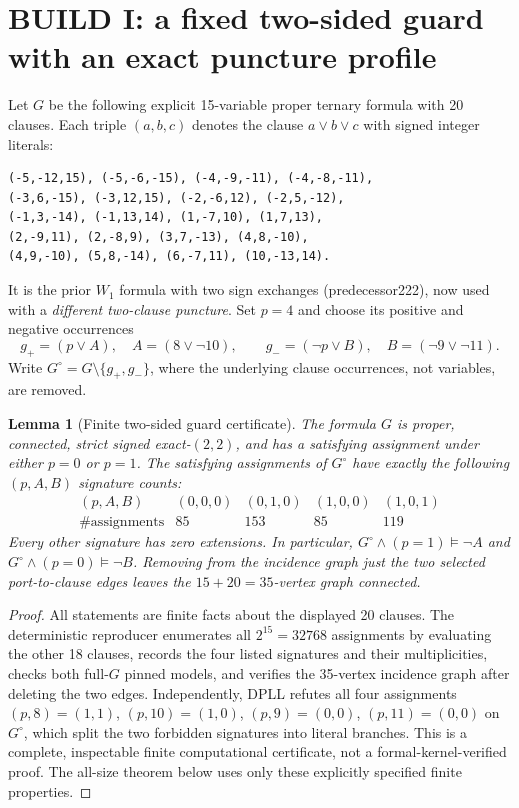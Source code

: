 \documentclass[11pt]{article}
\newtheorem{lemma}[theorem]{Lemma}
\begin{document}
\section{BUILD I: a fixed two-sided guard with an exact puncture profile}
Let $G$ be the following explicit 15-variable proper ternary formula with 20 clauses. Each triple $(a,b,c)$ denotes the clause $a\lor b\lor c$ with signed integer literals:
\begin{verbatim}
(-5,-12,15), (-5,-6,-15), (-4,-9,-11), (-4,-8,-11),
(-3,6,-15), (-3,12,15), (-2,-6,12), (-2,5,-12),
(-1,3,-14), (-1,13,14), (1,-7,10), (1,7,13),
(2,-9,11), (2,-8,9), (3,7,-13), (4,8,-10),
(4,9,-10), (5,8,-14), (6,-7,11), (10,-13,14).
\end{verbatim}
It is the prior $W_1$ formula with two sign exchanges (predecessor222), now used with a \emph{different two-clause puncture}. Set $p=4$ and choose its positive and negative occurrences
\[
 g_+=(p\vee A),\quad A=(8\vee\neg10),\qquad
 g_-=(\neg p\vee B),\quad B=(\neg9\vee\neg11).
\]
Write $G^\circ=G\setminus\{g_+,g_-\}$, where the underlying clause occurrences, not variables, are removed.
\begin{lemma}[Finite two-sided guard certificate]\label{lem:guard}
The formula $G$ is proper, connected, strict signed exact-$(2,2)$, and has a satisfying assignment under either $p=0$ or $p=1$. The satisfying assignments of $G^\circ$ have exactly the following $(p,A,B)$ signature counts:
\[
\begin{array}{c|rrrr}
 (p,A,B)&(0,0,0)&(0,1,0)&(1,0,0)&(1,0,1)\\\hline
 \#\mathrm{assignments}&85&153&85&119
\end{array}
\]
Every other signature has zero extensions. In particular, $G^\circ\wedge(p=1)\models\neg A$ and $G^\circ\wedge(p=0)\models\neg B$. Removing from the incidence graph just the two selected port-to-clause edges leaves the $15+20=35$-vertex graph connected.
\end{lemma}
\begin{proof}
All statements are finite facts about the displayed 20 clauses. The deterministic reproducer enumerates all $2^{15}=32768$ assignments by evaluating the other 18 clauses, records the four listed signatures and their multiplicities, checks both full-$G$ pinned models, and verifies the 35-vertex incidence graph after deleting the two edges. Independently, DPLL refutes all four assignments $(p,8)=(1,1)$, $(p,10)=(1,0)$, $(p,9)=(0,0)$, $(p,11)=(0,0)$ on $G^\circ$, which split the two forbidden signatures into literal branches. This is a complete, inspectable finite computational certificate, not a formal-kernel-verified proof. The all-size theorem below uses only these explicitly specified finite properties.
\end{proof}
\end{document}
